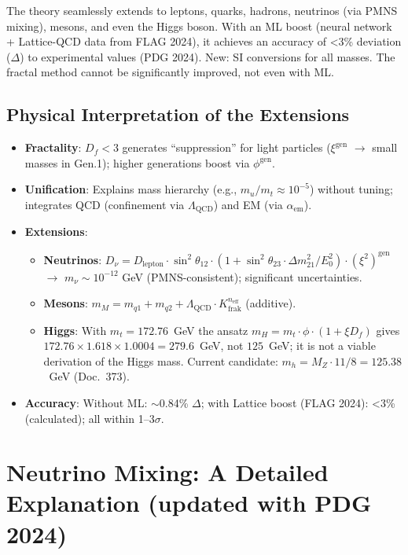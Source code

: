 	The theory seamlessly extends to leptons, quarks, hadrons, neutrinos (via PMNS mixing), mesons, and even the Higgs boson. With an ML boost (neural network + Lattice-QCD data from FLAG 2024), it achieves an accuracy of <3\% deviation ($\Delta$) to experimental values (PDG 2024). New: SI conversions for all masses. The fractal method cannot be significantly improved, not even with ML.
	
	\subsection{Physical Interpretation of the Extensions}
	\begin{itemize}
		\item \textbf{Fractality}: $D_f < 3$ generates ``suppression'' for light particles ($\xi^{\text{gen}}$ $\rightarrow$ small masses in Gen.1); higher generations boost via $\phi^{\text{gen}}$.
		\item \textbf{Unification}: Explains mass hierarchy (e.g., $m_u / m_t \approx 10^{-5}$) without tuning; integrates QCD (confinement via $\Lambda_{\text{QCD}}$) and EM (via $\alpha_{\text{em}}$).
		\item \textbf{Extensions}:
		\begin{itemize}
			\item \textbf{Neutrinos}: $D_\nu = D_{\text{lepton}} \cdot \sin^2 \theta_{12} \cdot (1 + \sin^2 \theta_{23} \cdot \Delta m^2_{21}/E_0^2) \cdot (\xi^2)^{\text{gen}}$ $\rightarrow$ $m_\nu \sim 10^{-12}$ GeV (PMNS-consistent); significant uncertainties.
			\item \textbf{Mesons}: $m_M = m_{q1} + m_{q2} + \Lambda_{\text{QCD}} \cdot K_{\text{frak}}^{n_{\text{eff}}}$ (additive).
			\item \textbf{Higgs}: With $m_t = 172.76$~GeV the ansatz $m_H = m_t \cdot \phi \cdot (1 + \xi D_f)$ gives $172.76 \times 1.618 \times 1.0004 = 279.6$~GeV, not $125$~GeV; it is not a viable derivation of the Higgs mass. Current candidate: $m_h = M_Z \cdot 11/8 = 125.38$~GeV (Doc.~373).
		\end{itemize}
		\item \textbf{Accuracy}: Without ML: $\sim$0.84\% $\Delta$; with Lattice boost (FLAG 2024): <3\% (calculated); all within 1--3$\sigma$.
	\end{itemize}
	
	\section{Neutrino Mixing: A Detailed Explanation (updated with PDG 2024)}
	\label{app:neutrino}
	
